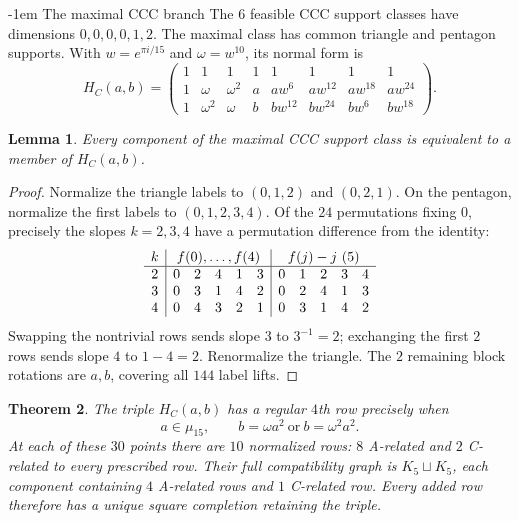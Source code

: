 \documentclass[11pt,a4paper]{article}
\makeatletter
\newtheorem{theorem}{Theorem}[section]
\newtheorem{lemma}[theorem]{Lemma}
\theoremstyle{plain}
\theoremstyle{definition}
\numberwithin{equation}{section}
\renewcommand\subsection{\@startsection{subsection}{2}{\z@}  {\medskipamount}  {-1em}  {\normalfont\normalsize\bfseries}}
\makeatother
\begin{document}
\subsection{The maximal CCC branch}\label{sec:ccc}
The $6$ feasible CCC support classes have dimensions $0,0,0,0,1,2$. The maximal class has common triangle and pentagon supports. With $w=e^{\pi i/15}$ and $\omega=w^{10}$, its normal form is
\begin{equation}\label{eq:CCC}
H_C(a,b)=
\begin{pmatrix}
1&1&1&1&1&1&1&1\\
1&\omega&\omega^2&a&aw^{6}&aw^{12}&aw^{18}&aw^{24}\\
1&\omega^2&\omega&b&bw^{12}&bw^{24}&bw^{6}&bw^{18}
\end{pmatrix}.
\end{equation}
\begin{lemma}
Every component of the maximal CCC support class is equivalent to a member of $H_C(a,b)$.
\end{lemma}
\begin{proof}
Normalize the triangle labels to $(0,1,2)$ and $(0,2,1)$. On the pentagon, normalize the first labels to $(0,1,2,3,4)$. Of the $24$ permutations fixing $0$, precisely the slopes $k=2,3,4$ have a permutation difference from the identity:
$$
\begin{array}{c|ccccc|ccccc}
k&\multicolumn{5}{c|}{f(0),\ldots,f(4)}&
\multicolumn{5}{c}{f(j)-j\ (5)}\\\hline
2&0&2&4&1&3&0&1&2&3&4\\
3&0&3&1&4&2&0&2&4&1&3\\
4&0&4&3&2&1&0&3&1&4&2
\end{array}
$$
Swapping the nontrivial rows sends slope $3$ to $3^{-1}=2$; exchanging the first $2$ rows sends slope $4$ to $1-4=2$. Renormalize the triangle. The $2$ remaining block rotations are $a,b$, covering all $144$ label lifts.
\end{proof}
\begin{theorem}\label{thm:CCCpoints}\label{thm:CCCgraph}
The triple $H_C(a,b)$ has a regular $4$th row precisely when
$$\boxed{a\in\mu_{15},\qquad b=\omega a^2\ \text{or}\ b=\omega^2a^2.}$$
At each of these $30$ points there are $10$ normalized rows: $8$ A-related and $2$ C-related to every prescribed row. Their full compatibility graph is $K_5\sqcup K_5$, each component containing $4$ A-related rows and $1$ C-related row. Every added row therefore has a unique square completion retaining the triple.
\end{theorem}
\end{document}
